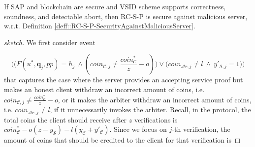 
 \begin{lemma}
 If SAP and blockchain are secure and  VSID scheme supports correctness, soundness, and detectable abort, then RC-S-P is secure against malicious server, w.r.t. Definition \ref{deff::RC-S-P-SecurityAgainstMaliciousServer}. 
 \end{lemma}
 

 \begin{proof}[sketch]
 We first consider event  
 
  $$\Bigg(\Big(F(u^{\scriptscriptstyle *}, \bm{q}_{\scriptscriptstyle j},{pp})= h_{\scriptscriptstyle j}\ \wedge (coin_{\scriptscriptstyle\mathcal{C},j}\neq  \frac{coin_{\scriptscriptstyle\mathcal C}^{\scriptscriptstyle*}}{z}-o)\Big)  \vee\Big(coin_{\scriptscriptstyle\mathcal{A}r,j}\neq l\ \wedge\  y'_{\scriptscriptstyle \mathcal {S},j}=1\Big)\Bigg)$$
   that captures the case where the server provides an accepting service proof but makes an honest client withdraw an incorrect amount of coins, i.e. $coin_{\scriptscriptstyle\mathcal{C},j}\neq  \frac{coin_{\scriptscriptstyle\mathcal C}^{\scriptscriptstyle*}}{z}-o$, or it makes the arbiter withdraw an incorrect amount of coins, i.e. $coin_{\scriptscriptstyle\mathcal{A}r,j}\neq l$, if it unnecessarily invokes the arbiter. Recall, in the protocol, the total coins the client should receive after $z$ verifications is $coin^{\scriptscriptstyle *}_{\scriptscriptstyle\mathcal C}-o(z-y_{\scriptscriptstyle\mathcal S})-l (y_{\scriptscriptstyle\mathcal C}+y'_{\scriptscriptstyle\mathcal C})$. Since we focus on  $j$-th verification, the amount of  coins that should be credited to the client for that verification is
 
 
% 
  

\end{proof}
